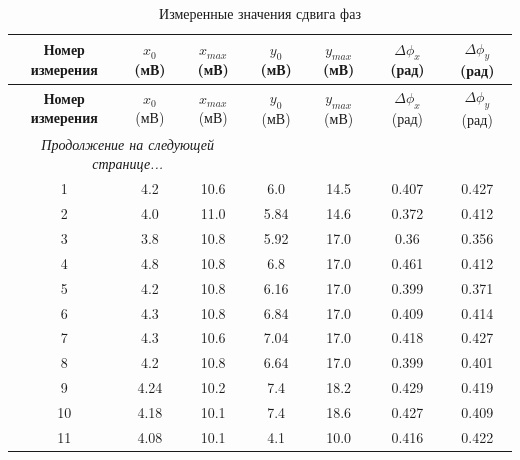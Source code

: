 \documentclass[a4paper,14pt]{article}
\begin{document}
\begin{longtable}{|c|c|c|c|c|c|c|}

    \caption{Измеренные значения сдвига фаз} \label{tab:tab3} \\
    \hline
    \textbf{Номер измерения} & $x_0$ (мВ) & $x_{max}$ (мВ) & $y_0$ (мВ) & $y_{max}$ (мВ) & $\Delta \phi_x$  (рад) & $\Delta \phi_y$ (рад)  \\
    \hline
    \endfirsthead


    \hline
    \textbf{Номер измерения} & $x_0$ (мВ) & $x_{max}$ (мВ) & $y_0$ (мВ) & $y_{max}$ (мВ) & $\Delta \phi_x$  (рад) & $\Delta \phi_y$ (рад)  \\
    \hline
    \endhead


    \hline
    \multicolumn{3}{|c|}{\textit{Продолжение на следующей странице...}} \\
    \hline
    \endfoot


    \hline
    \endlastfoot


1 & 4.2 & 10.6 & 6.0 & 14.5  & 0.407 & 0.427 \\ \hline
 2 & 4.0 & 11.0 & 5.84 & 14.6  & 0.372 & 0.412 \\ \hline
 3 & 3.8 & 10.8 & 5.92 & 17.0  & 0.36 & 0.356 \\ \hline
 4 & 4.8 & 10.8 & 6.8 & 17.0  & 0.461 & 0.412 \\ \hline
 5 & 4.2 & 10.8 & 6.16 & 17.0  & 0.399 & 0.371 \\ \hline
 6 & 4.3 & 10.8 & 6.84 & 17.0  & 0.409 & 0.414 \\ \hline
 7 & 4.3 & 10.6 & 7.04 & 17.0  & 0.418 & 0.427 \\ \hline
 8 & 4.2 & 10.8 & 6.64 & 17.0  & 0.399 & 0.401 \\ \hline
 9 & 4.24 & 10.2 & 7.4 & 18.2  & 0.429 & 0.419 \\ \hline
 10 & 4.18 & 10.1 & 7.4 & 18.6  & 0.427 & 0.409 \\ \hline
 11 & 4.08 & 10.1 & 4.1 & 10.0  & 0.416 & 0.422 \\ \hline

\end{longtable}
\end{document}
